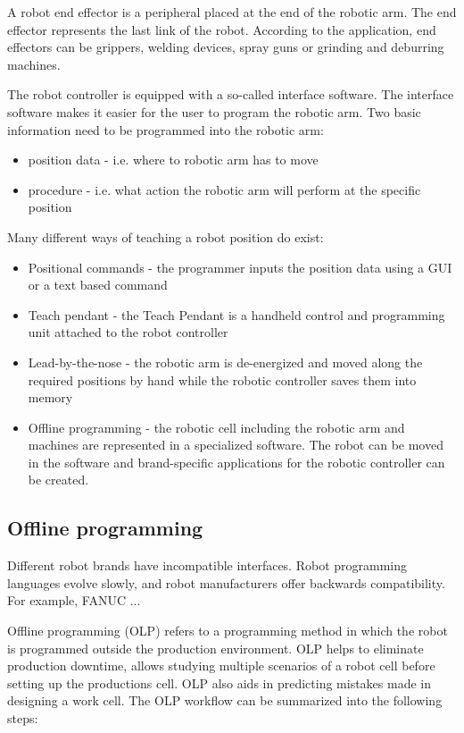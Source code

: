 A robot end effector is a peripheral placed at the end of the robotic arm. The end effector represents the last link of the robot. According to the application, end effectors can be grippers, welding devices, spray guns or grinding and deburring machines.

The robot controller is equipped with a so-called interface software. The interface software makes it easier for the user to program the robotic arm.  
Two basic information need to be programmed into the robotic arm:

\begin{itemize}
    \item position data - i.e. where to robotic arm has to move
    \item procedure - i.e. what action the robotic arm will perform at the specific position
\end{itemize}

Many different ways of teaching a robot position do exist:

\begin{itemize}
    \item Positional commands - the programmer inputs the position data using a GUI or a text based command
    \item Teach pendant - the Teach Pendant is a handheld control and programming unit attached to the robot controller
    \item Lead-by-the-nose - the robotic arm is de-energized and moved along the required positions by hand while the robotic controller saves them into memory
    \item Offline programming - the robotic cell including the robotic arm and machines are represented in a specialized software. The robot can be moved in the software and brand-specific applications for the robotic controller can be created.  

\end{itemize}

\subsection{Offline programming}
Different robot brands have incompatible interfaces. Robot programming languages evolve slowly, and robot manufacturers offer backwards compatibility. For example, FANUC ...

Offline programming  (OLP) refers to a programming method in which the robot is programmed outside the production environment. OLP helps to eliminate production downtime, allows studying multiple scenarios of a robot cell before setting up the productions cell. OLP also aids in predicting mistakes made in designing a work cell. The OLP workflow can be summarized into the following steps:

